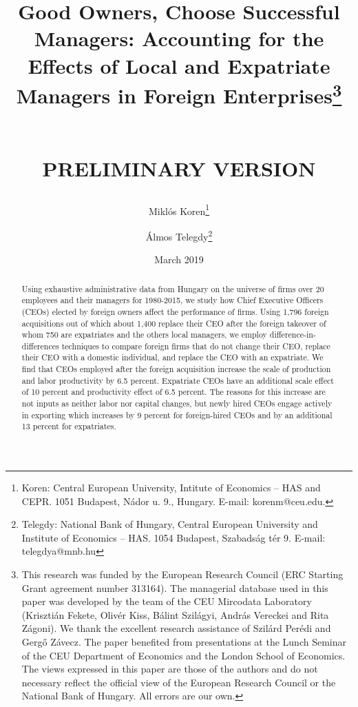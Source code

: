 \documentclass[12pt,a4paper]{article}
\begin{document}
\title{Good Owners, Choose Successful Managers: Accounting for the Effects of Local and Expatriate Managers in Foreign Enterprises\thanks{This research was funded by the European Research Council (ERC Starting Grant agreement number 313164). The managerial database used in this paper was developed by the team of the CEU Mircodata Laboratory (Krisztián Fekete, Olivér Kiss, Bálint Szilágyi, András Vereckei and Rita Zágoni). We thank the excellent research assistance of Szilárd Perédi and Gergő Závecz. The paper benefited from presentations at the Lunch Seminar of the CEU Department of Economics and the London School of Economics. The views expressed in this paper are those of the authors and do not necessary reflect the official view of the European Research Council or the National Bank of Hungary. All errors are our own.}

\newline\\\small{PRELIMINARY VERSION}}

\author{Miklós Koren\thanks{Koren: Central European University, Intitute of Economics -- HAS and CEPR. 1051 Budapest, Nádor u. 9., Hungary. E-mail: korenm@ceu.edu.} \and Álmos Telegdy\thanks{Telegdy: National Bank of Hungary, Central European University and Institute of Economics -- HAS. 1054 Budapest, Szabadság tér 9. E-mail: telegdya@mnb.hu}}

\date{March 2019}
\maketitle

\begin{abstract}
Using exhaustive administrative data from Hungary on the universe of firms over 20 employees and their managers for 1980-2015, we study how Chief Executive Officers (CEOs) elected by foreign owners affect the performance of firms. Using 1,796 foreign acquisitions out of which about 1,400 replace their CEO after the foreign takeover of whom 750 are expatriates and the others local managers, we employ difference-in-differences techniques to compare foreign firms that do not change their CEO, replace their CEO with a domestic individual, and replace the CEO with an expatriate. We find that CEOs employed after the foreign acquisition increase the scale of production and labor productivity by 6.5 percent. Expatriate CEOs have an additional scale effect of 10 percent and productivity effect of 6.5 percent. The reasons for this increase are not inputs as neither labor nor capital changes, but newly hired CEOs engage actively in exporting which increases by 9 percent for foreign-hired CEOs and by an additional 13 percent for expatriates.
\end{abstract}
\end{document}

